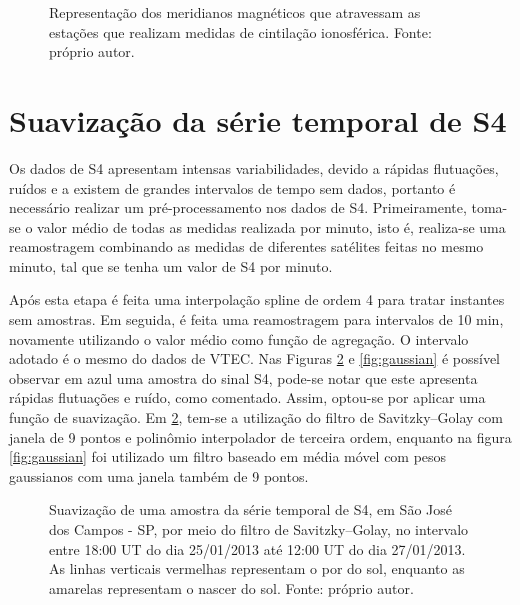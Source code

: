 \begin{figure}[H]
\centering
\makebox[\textwidth][c]{}
\vspace{-60pt}
\caption{Representação dos meridianos magnéticos que atravessam as estações que realizam medidas de cintilação ionosférica. Fonte: próprio autor.}
\label{fig:mapstations}
\end{figure}

\section{Suavização da série temporal de S4}

Os dados de S4 apresentam intensas variabilidades, devido a rápidas flutuações, ruídos e a existem de grandes intervalos de tempo sem dados, portanto é necessário realizar um pré-processamento nos dados de S4. Primeiramente, toma-se o valor médio de todas as medidas realizada por minuto, isto é, realiza-se uma reamostragem combinando as medidas de diferentes satélites feitas no mesmo minuto, tal que se tenha um valor de S4 por minuto. 

Após esta etapa é feita uma interpolação spline de ordem 4 para tratar instantes sem amostras. Em seguida, é feita uma reamostragem para intervalos de 10 min, novamente utilizando o valor médio como função de agregação. O intervalo adotado é o mesmo do dados de VTEC. Nas Figuras \ref{fig:savgol} e \ref{fig:gaussian} é possível observar em azul uma amostra do sinal S4, pode-se notar que este apresenta rápidas flutuações e ruído, como comentado. Assim, optou-se por aplicar uma função de suavização. Em \ref{fig:savgol}, tem-se a utilização do filtro de Savitzky–Golay com janela de 9 pontos e polinômio interpolador de terceira ordem, enquanto na figura \ref{fig:gaussian} foi utilizado um filtro baseado em média móvel com pesos gaussianos com uma janela também de 9 pontos.

\begin{figure}[H]
\centering
{}
\caption{Suavização de uma amostra da série temporal de S4, em São José dos Campos - SP, por meio do filtro de Savitzky–Golay, no intervalo entre 18:00 UT do dia 25/01/2013 até 12:00 UT do dia 27/01/2013. As linhas verticais vermelhas representam o por do sol, enquanto as amarelas representam o nascer do sol. Fonte: próprio autor.}
\label{fig:savgol}
\end{figure}

